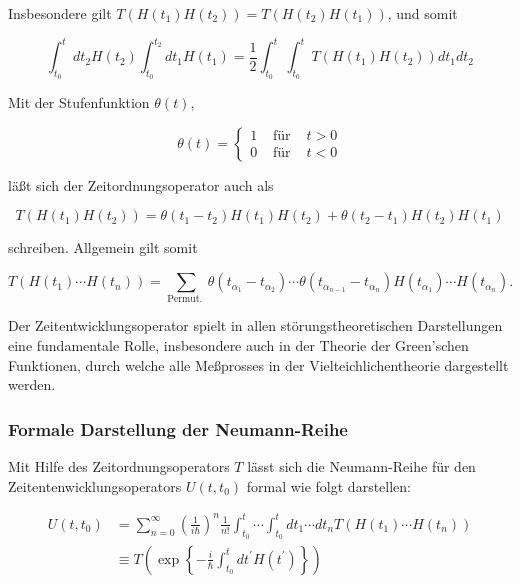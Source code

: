 \documentclass[10pt, letterpaper]{article}
\begin{document}
Insbesondere gilt $T\left(H\left(t_{1}\right) H\left(t_{2}\right)\right)=T\left(H\left(t_{2}\right) H\left(t_{1}\right)\right)$, und somit

$$
\int_{t_{0}}^{t} d t_{2} H\left(t_{2}\right) \int_{t_{0}}^{t_{2}} d t_{1} H\left(t_{1}\right)=\frac{1}{2} \int_{t_{0}}^{t} \int_{t_{0}}^{t} T\left(H\left(t_{1}\right) H\left(t_{2}\right)\right) d t_{1} d t_{2}
$$

Mit der Stufenfunktion $\theta(t)$,

$$
\theta(t)=\left\{\begin{array}{lll}
1 & \text { für } & t>0 \\
0 & \text { für } & t<0
\end{array}\right.
$$

läßt sich der Zeitordnungsoperator auch als

$$
T\left(H\left(t_{1}\right) H\left(t_{2}\right)\right)=\theta\left(t_{1}-t_{2}\right) H\left(t_{1}\right) H\left(t_{2}\right)+\theta\left(t_{2}-t_{1}\right) H\left(t_{2}\right) H\left(t_{1}\right)
$$

schreiben. Allgemein gilt somit

$$
T\left(H\left(t_{1}\right) \cdots H\left(t_{n}\right)\right)=\sum_{\text {Permut. }} \theta\left(t_{\alpha_{1}}-t_{\alpha_{2}}\right) \cdots \theta\left(t_{\alpha_{n-1}}-t_{\alpha_{n}}\right) H\left(t_{\alpha_{1}}\right) \cdots H\left(t_{\alpha_{n}}\right) .
$$

Der Zeitentwicklungsoperator spielt in allen störungstheoretischen Darstellungen eine fundamentale Rolle, insbesondere auch in der Theorie der Green'schen Funktionen, durch welche alle Meßprosses in der Vielteichlichentheorie dargestellt werden.

\subsubsection*{Formale Darstellung der Neumann-Reihe}
Mit Hilfe des Zeitordnungsoperators $T$ lässt sich die Neumann-Reihe für den Zeitentenwicklungsoperators $U\left(t, t_{0}\right)$ formal wie folgt darstellen:

$$
\begin{aligned}
U\left(t, t_{0}\right) & =\sum_{n=0}^{\infty}\left(\frac{1}{i \hbar}\right)^{n} \frac{1}{n!} \int_{t_{0}}^{t} \cdots \int_{t_{0}}^{t} d t_{1} \cdots d t_{n} T\left(H\left(t_{1}\right) \cdots H\left(t_{n}\right)\right) \\
& \equiv T\left(\exp \left\{-\frac{i}{\hbar} \int_{t_{0}}^{t} d t^{\prime} H\left(t^{\prime}\right)\right\}\right)
\end{aligned}
$$
\end{document}
